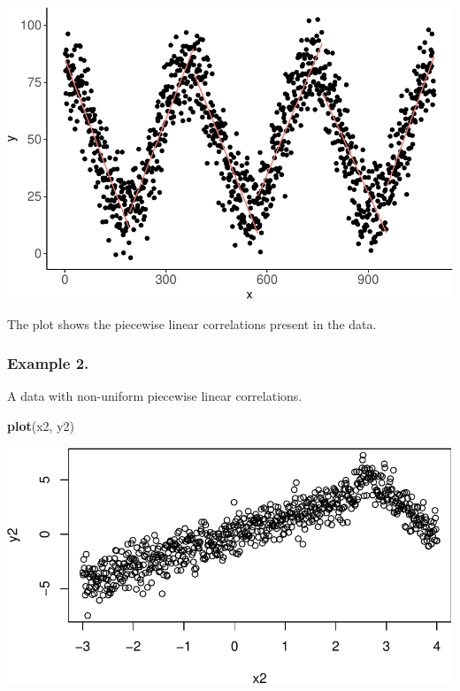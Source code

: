 \documentclass[]{article}
\newenvironment{Shaded}{\begin{snugshade}}{\end{snugshade}}
\newcommand{\KeywordTok}[1]{\textcolor[rgb]{0.13,0.29,0.53}{\textbf{#1}}}
\newcommand{\NormalTok}[1]{#1}
\begin{document}
\begin{center}\includegraphics{README_files/figure-latex/Figure-1.2-1} \end{center}

The plot shows the piecewise linear correlations present in the data.

\hypertarget{example-2.}{%
\subsubsection{Example 2.}\label{example-2.}}

A data with non-uniform piecewise linear correlations.

\begin{Shaded}
\begin{Highlighting}[]
\KeywordTok{plot}\NormalTok{(x2, y2)}
\end{Highlighting}
\end{Shaded}

\begin{center}\includegraphics{README_files/figure-latex/Figure-2.1-1} \end{center}
\end{document}

